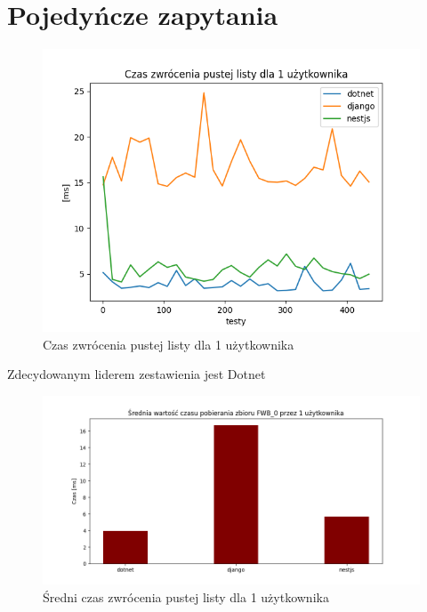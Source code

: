 \section{Pojedyńcze zapytania}

\begin{figure}[!hb]
	\centering \includegraphics[width=1\linewidth]{rysunki/Request_duration_for_1_user.png}
	\caption{Czas zwrócenia pustej listy dla 1 użytkownika}
	\label{rys:request_duration_for_1_user}
\end{figure}

Zdecydowanym liderem zestawienia jest Dotnet

\begin{figure}[!hb]
	\centering \includegraphics[width=1\linewidth]{rysunki/Mean_duration_for_1_user.png}
	\caption{Średni czas zwrócenia pustej listy dla 1 użytkownika}
	\label{rys:mean_duration_for_1_user}
\end{figure}
